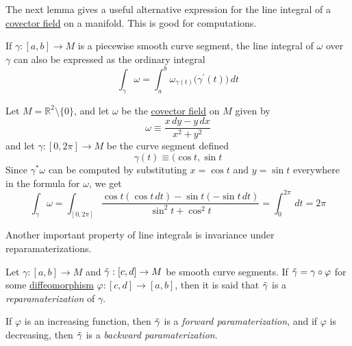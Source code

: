 \documentclass{article}
\newcounter{definition}[section]
\newcounter{example}[section]
\begin{document}
    The next lemma gives a useful alternative expression for the line integral of a \hyperref[def:covector-field]{covector field} on a manifold. This is good for computations.

    \begin{lemma}
      \label{thm:line-integral-over-a-piecewise-smooth-segment}
    If $\gamma: [a,b] \to M$ is a piecewise smooth curve segment, the line integral of $\omega$ over $\gamma$ can also be expressed as the ordinary integral 
    \begin{equation}
      \int_\gamma \omega = \int_a^b \omega_{\gamma(t)} \big( \gamma^\prime (t) \big)\,dt
    \end{equation}
    \end{lemma}

    \begin{example}
      \label{ex:the-angle-form-on-the-punctured-plane}
    Let $M = \mathbb{R}^2 \setminus \{0\}$, and let $\omega$ be the \hyperref[def:covector-field]{covector field} on $M$ given by
    \begin{equation}
      \omega \equiv \frac{x \,dy - y\,dx}{x^2 + y^2}
    \end{equation}
    and let $\gamma: [0, 2\pi] \to M$ be the curve segment defined 
    \begin{equation}
      \gamma(t) \equiv \big( \cos{t}, \sin{t}
    \end{equation}
    Since $\gamma^* \omega$ can be computed by substituting $x = \cos{t}$ and $y = \sin{t}$ everywhere in the formula for $\omega$, we get
    \begin{equation}
      \int_\gamma \omega = \int_{[0,2\pi]} \frac{\cos{t} (\cos{t}\,dt) - \sin{t} (-\sin{t}\,dt)}{\sin^2{t} + \cos^2{t}} = \int_0^{2\pi} \,dt = 2\pi
    \end{equation}
    \end{example}

    Another important property of line integrals is invariance under reparamaterizations.

    \begin{definition}[Reparameterization]
      \label{def:reparameterization}
    Let $\gamma: [a,b] \to M$ and $\Tilde{\gamma}: [c,d] \to M$ be smooth curve segments. If $\Tilde{\gamma} = \gamma \circ \varphi$ for some \hyperref[def:diffeomorphism-2]{diffeomorphism} $\varphi: [c,d] \to [a,b]$, then it is said that $\Tilde{\gamma}$ is a \textit{reparamaterization} of $\gamma$. 

    If $\varphi$ is an increasing function, then $\Tilde{\gamma}$ is a \textit{forward paramaterization}, and if $\varphi$ is decreasing, then $\Tilde{\gamma}$ is a \textit{backward paramaterization}. 
    \end{definition}
\end{document}
